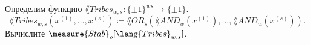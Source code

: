 Определим функцию $\lang{Tribes}_{w, s}\colon \{\pm 1\}^{w s} \to \{\pm 1\}$.
$$
    \lang{Tribes}_{w, s}(x^{(1)}, \dots, x^{(s)}) \coloneqq  \lang{OR}_{s}(\lang{AND}_w(x^{(1)}), \dots,
    \lang{AND}_w(x^{(s)})).
$$
Вычислите $\measure{Stab}_{\rho}[\lang{Tribes}_{w, s}]$. 